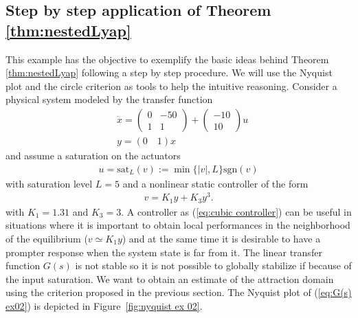 \documentclass[letterpaper,10pt,twocolumn,journal,final]{IEEEtran}
\newcommand{\sat}{\mathrm{sat}}
\newcommand{\sgn}{\mathrm{sgn}}
\begin{document}
\subsection{Step by step application of Theorem \ref{thm:nestedLyap}}
This example has the objective to exemplify the basic ideas behind Theorem \ref{thm:nestedLyap} following a step by step procedure. We will use the Nyquist plot and the circle criterion as tools to help the intuitive reasoning.
Consider a physical system modeled by the transfer function
\begin{align}\label{eq:G(s) ex02}
	&\dot x =\left(\begin{array}{cc}
		0 & -50\\ 1 & 1
		\end{array}\right)+
		\left(\begin{array}{c}
		-10\\ 10 
		\end{array}\right)u\\
	& y = (0 \quad 1)x
\end{align}
and assume a saturation on the actuators
\begin{align}
	u=\sat_L(v):=\min\{|v|,L\}\sgn(v)
\end{align}
with saturation level $L=5$ and a nonlinear static controller of the form
\begin{align}\label{eq:cubic controller}
	v=K_1 y+ K_3 y^3.
\end{align}
with $K_1=1.31$ and $K_3=3$.
A controller as (\ref{eq:cubic controller}) can be useful in situations where it is important to obtain local performances in the neighborhood of the equilibrium ($v\simeq K_1 y$) and at the same time it is desirable to have a prompter response when the system state is far from it. The linear transfer function $G(s)$ is not stable so it is not possible to globally stabilize if because of the input saturation. We want to obtain an estimate of the attraction domain using the criterion proposed in the previous section.
The Nyquist plot of (\ref{eq:G(s) ex02}) is depicted in Figure~\ref{fig:nyquist ex 02}.
\end{document}
